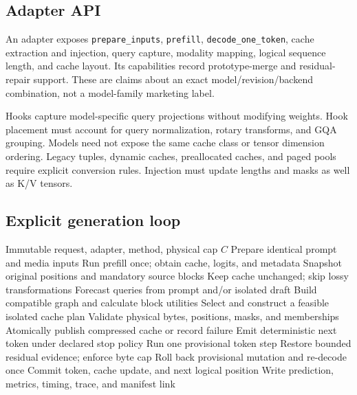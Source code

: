 \subsection{Adapter API}
An adapter exposes \texttt{prepare\_inputs}, \texttt{prefill},
\texttt{decode\_one\_token}, cache extraction and injection, query capture,
modality mapping, logical sequence length, and cache layout. Its capabilities
record prototype-merge and residual-repair support. These are claims about an
exact model/revision/backend combination, not a model-family marketing label.

Hooks capture model-specific query projections without modifying weights.
Hook placement must account for query normalization, rotary transforms, and
GQA grouping. Models need not expose the same cache class or tensor dimension
ordering. Legacy tuples, dynamic caches, preallocated caches, and paged pools
require explicit conversion rules. Injection must update lengths and masks
as well as K/V tensors.

\subsection{Explicit generation loop}
\begin{algorithm}[h]
\caption{One request with an explicit cache boundary}
\label{alg:runtime}
\begin{algorithmic}[1]
\REQUIRE Immutable request, adapter, method, physical cap $C$
\STATE Prepare identical prompt and media inputs
\STATE Run prefill once; obtain cache, logits, and metadata
\STATE Snapshot original positions and mandatory source blocks
  \STATE Keep cache unchanged; skip lossy transformations
\ELSE
  \STATE Forecast queries from prompt and/or isolated draft
  \STATE Build compatible graph and calculate block utilities
  \STATE Select and construct a feasible isolated cache plan
  \STATE Validate physical bytes, positions, masks, and memberships
  \STATE Atomically publish compressed cache or record failure
\ENDIF
\STATE Emit deterministic next token under declared stop policy
  \STATE Run one provisional token step
    \STATE Restore bounded residual evidence; enforce byte cap
    \STATE Roll back provisional mutation and re-decode once
  \ENDIF
  \STATE Commit token, cache update, and next logical position
\ENDWHILE
\STATE Write prediction, metrics, timing, trace, and manifest link
\end{algorithmic}
\end{algorithm}

